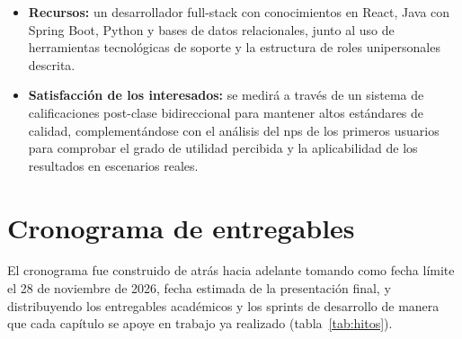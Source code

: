 \begin{itemize}
          especificaciones de los módulos se ejercita con al menos una
          prueba de integración de punta a punta, y los casos borde que
          cada especificación resuelve son casos de prueba obligatorios.
          El backend se prueba con JUnit 5 y Testcontainers contra una
          base PostgreSQL real; el frontend, con pruebas \gls{e2e} en
          Playwright y controles de accesibilidad con axe-core; el motor
          de \gls{matching}, con pytest. Las suites corren en integración
          continua en cada cambio, y una prueba \gls{e2e} nocturna
          recorre el camino crítico contra la base, el motor de
          \gls{matching} y el backend reales. La planificación original
          fijaba una cobertura mínima del 70\,\% por módulo; durante la
          implementación se optó por medir primero la cobertura de
          líneas con JaCoCo, sin un umbral que corte la compilación, y
          decidir el umbral con el valor medido (ADR-000-05). Al
          18 de octubre de 2026 el backend contaba con 859 pruebas y una
          cobertura de líneas del 89,6\,\%. La calidad percibida se medirá
          con los indicadores específicos de la investigación a partir de
          la puesta en marcha.
    \item \textbf{Recursos:} un desarrollador full-stack con
          conocimientos en React, Java con Spring Boot, Python y bases de
          datos relacionales, junto al uso de herramientas tecnológicas de
          soporte y la estructura de roles unipersonales descrita.
    \item \textbf{Satisfacción de los interesados:} se medirá a través de
          un sistema de calificaciones post-clase bidireccional para
          mantener altos estándares de calidad, complementándose con el
          análisis del \gls{nps} de los primeros usuarios para comprobar el grado
          de utilidad percibida y la aplicabilidad de los resultados en
          escenarios reales.
\end{itemize}

\section{Cronograma de entregables}

El cronograma fue construido de atrás hacia adelante tomando como fecha
límite el 28 de noviembre de 2026, fecha estimada de la presentación
final, y distribuyendo los entregables académicos y los sprints de
desarrollo de manera que cada capítulo se apoye en trabajo ya realizado
(tabla~\ref{tab:hitos}).

